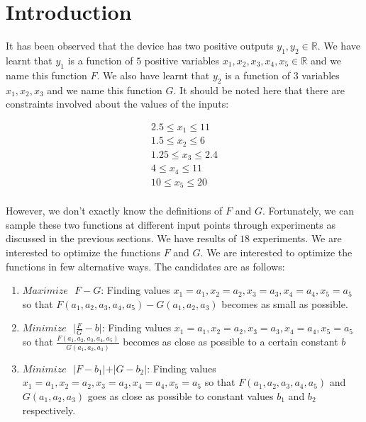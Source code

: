 \documentclass[11pt]{article}
\begin{document}
\maketitle
\section{Introduction}
It has been observed that the device has two positive outputs $y_1,y_2 \in \mathbb{R}$. We have learnt that $y_1$ is a function of $5$ positive variables $x_1,x_2,x_3,x_4,x_5 \in \mathbb{R}$ and we name this function $F$. We also have learnt that $y_2$ is a function of $3$ variables $x_1,x_2,x_3$ and we name this function $G$. It should be noted here that there are constraints involved about the values of the inputs:
\begin{tiny}
\begin{eqnarray*}
2.5 \leq x_1 \leq 11 \\
1.5 \leq x_2 \leq 6 \\
1.25 \leq x_3 \leq 2.4 \\
4 \leq x_4 \leq 11 \\
10 \leq x_5 \leq 20 \\
\end{eqnarray*}
\end{tiny} However, we don't exactly know the definitions of $F$ and $G$. Fortunately, we can sample these two functions at different input points through experiments as discussed in the previous sections. We have results of $18$ experiments. We are interested to optimize the functions $F$ and $G$. We are interested to optimize the functions in few alternative ways. The candidates are as follows:
\begin{enumerate}
\item $Maximize \text{ }F - G$: Finding values $x_1 = a_1,x_2 = a_2,x_3 = a_3,x_4 = a_4,x_5 = a_5$ so that $F(a_1,a_2,a_3,a_4,a_5) - G(a_1,a_2,a_3)$ becomes as small as possible.
\item $Minimize \text{ } \vert\frac{F}{G}-b\vert$: Finding values $x_1 = a_1,x_2 = a_2,x_3 = a_3,x_4 = a_4,x_5 = a_5$ so that $\frac{F(a_1,a_2,a_3,a_4,a_5)}{G(a_1,a_2,a_3)}$ becomes as close as possible to a certain constant $b$
\item $Minimize \text{ } \vert F-b_1 \vert + \vert G-b_2 \vert$: Finding values $x_1 = a_1,x_2 = a_2,x_3 = a_3,x_4 = a_4,x_5 = a_5$ so that $F(a_1,a_2,a_3,a_4,a_5)$ and $G(a_1,a_2,a_3)$  goes as close as possible to constant values $b_1$ and $b_2$ respectively.
\end{enumerate}
\end{document}
